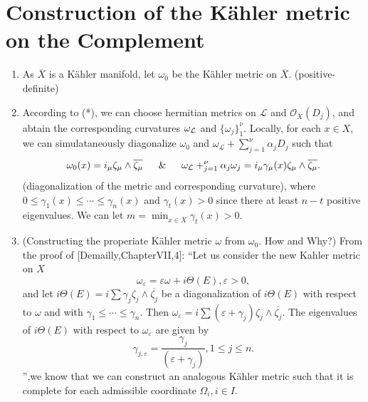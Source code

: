 \documentclass[lang=en,12pt]{beautybook}
\begin{document}
\section{Construction of the K\"ahler metric on the Complement}

\begin{enumerate}
  \item As $\overline{X}$ is a K\"ahler manifold, let $\omega_0$ be the K\"ahler
        metric on $\overline{X}$. (positive-definite)

  \item According to (*), we can choose hermitian metrics on $\mathcal{L}$ and
        $\mathcal{O}_{\overline{X}} (D_j)$, and abtain the corresponding curvatures
        ${{\omega_{\mathcal{L}}} }_{\texttt{\text{{\ttfamily{}}}}}$ and $\{ \omega_j
          \}_1^{\nu}$. Locally, for each $x \in X$, we can simulataneously diagonalize
        $\omega_0$ and $\omega_{\mathcal{L}} + \sum_{j = 1}^{\nu} \alpha_j D_j$ such
        that
        \[ \omega_0 (x) = i \sum_{\mu} \zeta_{\mu} \wedge \overline{\zeta_{\mu}}
          \quad\And\quad \omega_{\mathcal{L}} + \sum_{j = 1}^{\nu} \alpha_j \omega_j = i
          \sum_{\mu} \gamma_{\mu} (x) \zeta_{\mu} \wedge \overline{\zeta_{\mu}} .
        \]
        (diagonalization of the metric and corresponding curvature), where $0 \leqslant \gamma_1 (x)
          \leqslant \cdots \leqslant \gamma_n (x)$ and $\gamma_t (x) > 0$ since there
        at least $n - t$ positive eigenvalues. We can let $m = \min_{x \in
            \overline{X}} \gamma_t (x) > 0$.

  \item\label{Demailly} (Constructing the properiate K\"ahler metric $\omega$ from $\omega_0$.
        How and Why?) {\color{purple}From the proof of [Demailly,ChapterVII,4]: ``Let us consider
          the new Kahler metric on $X$
          \[ \omega_{\varepsilon} = \varepsilon \omega + i \Theta (E), \varepsilon >
            0, \]
          and let $i \Theta (E) = i \sum \gamma_j \zeta_j \wedge \overline{\zeta_j}$
          be a diagonalization of $i \Theta (E)$ with respect to $\omega$ and with
          $\gamma_1 \leqslant \cdots \leqslant \gamma_n .$ Then $\omega_{\varepsilon}
            = i \sum (\varepsilon + \gamma_j) \zeta_j \wedge \overline{\zeta_j}$. The
          eigenvalues of $i \Theta (E)$ with respect to $\omega_{\varepsilon}$ are
          given by
          \[ \gamma_{j, \varepsilon} = \frac{\gamma_j}{(\varepsilon + \gamma_j)}, 1
            \leqslant j \leqslant n. \]
          ''},we know that we can construct an analogous K\"ahler metric such that it is
        complete for each admissible coordinate $\Omega_i, i \in I$.


\end{enumerate}
\end{document}
